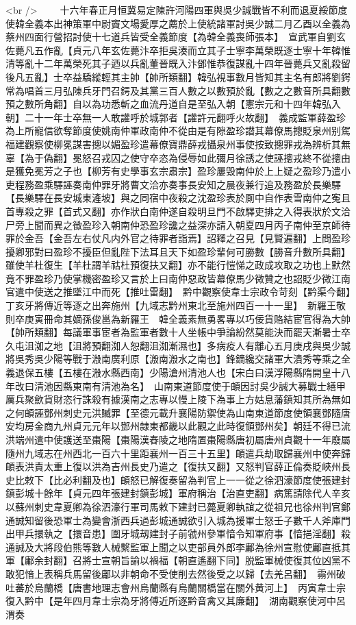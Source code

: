 <br />
　　十六年春正月恒冀易定陳許河陽四軍與吳少誠戰皆不利而退夏綏節度使韓全義本出神策軍中尉竇文場愛厚之薦於上使統諸軍討吳少誠二月乙酉以全義為蔡州四面行營招討使十七道兵皆受全義節度【為韓全義喪師張本】　宣武軍自劉玄佐薨凡五作亂【貞元八年玄佐薨汴卒拒吳湊而立其子士寧李萬榮既逐士寧十年韓惟清等亂十二年萬榮死其子迺以兵亂董晉既入汴鄧惟恭復謀亂十四年晉薨兵又亂殺留後凡五亂】士卒益驕縱輕其主帥【帥所類翻】韓弘視事數月皆知其主名有郎將劉鍔常為唱首三月弘陳兵牙門召鍔及其黨三百人數之以數預於亂【數之之數音所具翻數預之數所角翻】自以為功悉斬之血流丹道自是至弘入朝【憲宗元和十四年韓弘入朝】二十一年士卒無一人敢讙呼於城郭者【讙許元翻呼火故翻】　義成監軍薛盈珍為上所寵信欲奪節度使姚南仲軍政南仲不從由是有隙盈珍譛其幕僚馬摠貶泉州别駕福建觀察使柳冕謀害摠以媚盈珍遣幕僚寶鼎薛戎攝泉州事使按致摠罪戎為辨析其無辜【為于偽翻】冕怒召戎囚之使守卒恣為侵辱如此彌月徐誘之使誣摠戎終不從摠由是獲免冕芳之子也【柳芳有史學事玄宗肅宗】盈珍屢毁南仲於上上疑之盈珍乃遣小吏程務盈乘驛誣奏南仲罪牙將曹文洽亦奏事長安知之晨夜兼行追及務盈於長樂驛【長樂驛在長安城東滻坡】與之同宿中夜殺之沈盈珍表於厠中自作表雪南仲之寃且首專殺之罪【首式又翻】亦作狀白南仲遂自殺明旦門不啟驛吏排之入得表狀於文洽尸旁上聞而異之徵盈珍入朝南仲恐盈珍讒之益深亦請入朝夏四月丙子南仲至京師待罪於金吾【金吾左右仗凡内外官之待罪者詣焉】詔釋之召見【見賢遍翻】上問盈珍擾卿邪對曰盈珍不擾臣但亂陛下法耳且天下如盈珍輩何可勝數【勝音升數所具翻】雖使羊杜復生【羊杜謂羊祜杜預復扶又翻】亦不能行愷悌之政成攻取之功也上默然竟不罪盈珍乃使掌機密盈珍又言於上曰南仲惡政皆幕僚馬少微贊之也詔貶少微江南官遣中使送之推墜江中而死【推吐雷翻】　黔中觀察使韋士宗政令苛刻【黔渠今翻】丁亥牙將傳近等逐之出奔施州【九域志黔州東北至施州四百一十一里】　新羅王敬則卒庚寅冊命其嫡孫俊邕為新羅王　韓全義素無勇畧專以巧佞貨賂結宦官得為大帥【帥所類翻】每議軍事宦者為監軍者數十人坐帳中爭論紛然莫能決而罷天漸暑士卒久屯沮洳之地【沮將預翻洳人恕翻沮洳漸濕也】多病疫人有離心五月庚戌與吳少誠將吳秀吳少陽等戰于溵南廣利原【溵南溵水之南也】鋒鏑纔交諸軍大潰秀等乘之全義退保五樓【五樓在溵水縣西南】少陽滄州清池人也【宋白曰漢浮陽縣隋開皇十八年改曰清池因縣東南有清池為名】　山南東道節度使于頔因討吳少誠大募戰士繕甲厲兵聚歛貨財恣行誅殺有據漢南之志專以慢上陵下為事上方姑息藩鎮知其所為無如之何頔誣鄧州刺史元洪贓罪【至德元載升襄陽防禦使為山南東道節度使領襄鄧隨唐安均房金商九州貞元元年以鄧州隸東都畿以此觀之此時復領鄧州矣】朝廷不得已流洪端州遣中使護送至棗陽【棗陽漢舂陵之地隋置棗陽縣唐初屬唐州貞觀十一年廢屬隨州九域志在州西北一百六十里距襄州一百三十五里】頔遣兵劫取歸襄州中使奔歸頔表洪責太重上復以洪為吉州長史乃遣之【復扶又翻】又怒判官薛正倫奏貶峽州長史比敕下【比必利翻及也】頔怒已解復奏留為判官上一一從之徐泗濠節度使張建封鎮彭城十餘年【貞元四年張建封鎮彭城】軍府稱治【治直吏翻】病篤請除代人辛亥以蘇州刺史韋夏卿為徐泗濠行軍司馬敕下建封已薨夏卿執誼之從祖兄也徐州判官鄭通誠知留後恐軍士為變會浙西兵過彭城通誠欲引入城為援軍士怒壬子數千人斧庫門出甲兵擐執之【擐音患】圍牙城刼建封子前虢州參軍愔令知軍府事【愔挹淫翻】殺通誠及大將段伯熊等數人械繫監軍上聞之以吏部員外郎李鄘為徐州宣慰使鄘直抵其軍【鄘余封翻】召將士宣朝旨諭以禍福【朝直遙翻下同】脱監軍械使復其位凶黨不敢犯愔上表稱兵馬留後鄘以非朝命不受使削去然後受之以歸【去羌呂翻】　霛州破吐蕃於烏蘭橋【唐書地理志會州烏蘭縣有烏蘭關橋當在關外黄河上】　丙寅韋士宗復入黔中【是年四月韋士宗為牙將傅近所逐黔音禽又其廉翻】　湖南觀察使河中呂渭奏
